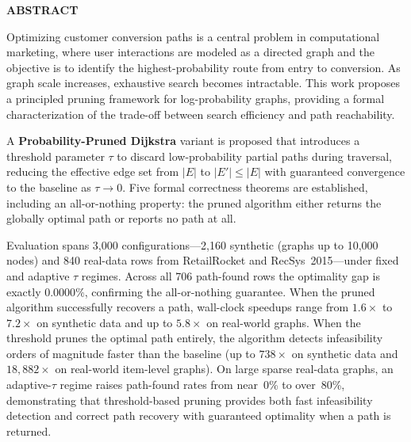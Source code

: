 {}

\begin{center}
    \large{\bf ABSTRACT}
\end{center}

Optimizing customer conversion paths is a central problem in computational marketing, where user interactions are modeled as a directed graph and the objective is to identify the highest-probability route from entry to conversion. As graph scale increases, exhaustive search becomes intractable. This work proposes a principled pruning framework for log-probability graphs, providing a formal characterization of the trade-off between search efficiency and path reachability.

A \textbf{Probability-Pruned Dijkstra} variant is proposed that introduces a threshold parameter $\tau$ to discard low-probability partial paths during traversal, reducing the effective edge set from $|E|$ to $|E'|\leq|E|$ with guaranteed convergence to the baseline as $\tau\to 0$. Five formal correctness theorems are established, including an all-or-nothing property: the pruned algorithm either returns the globally optimal path or reports no path at all.

Evaluation spans 3,000 configurations---2,160 synthetic (graphs up to 10,000 nodes) and 840 real-data rows from RetailRocket and RecSys~2015---under fixed and adaptive $\tau$ regimes. Across all 706 path-found rows the optimality gap is exactly $0.0000\%$, confirming the all-or-nothing guarantee. When the pruned algorithm successfully recovers a path, wall-clock speedups range from $1.6\times$ to $7.2\times$ on synthetic data and up to $5.8\times$ on real-world graphs. When the threshold prunes the optimal path entirely, the algorithm detects infeasibility orders of magnitude faster than the baseline (up to $738\times$ on synthetic data and $18{,}882\times$ on real-world item-level graphs). On large sparse real-data graphs, an adaptive-$\tau$ regime raises path-found rates from near~0\% to over~80\%, demonstrating that threshold-based pruning provides both fast infeasibility detection and correct path recovery with guaranteed optimality when a path is returned.
